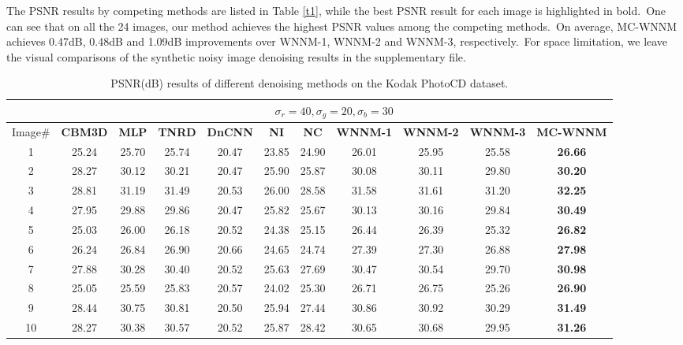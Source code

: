 The PSNR results by competing methods are listed in Table \ref{t1}, while the best PSNR result for each image is highlighted in bold.\ One can see that on all the 24 images, our method achieves the highest PSNR values among the competing methods.\ On average, MC-WNNM achieves 0.47dB, 0.48dB and 1.09dB improvements over WNNM-1, WNNM-2 and WNNM-3, respectively.\ For space limitation, we leave the visual comparisons of the synthetic noisy image denoising results in the supplementary file.

\begin{table}
\caption{PSNR(dB) results of different denoising methods on the Kodak PhotoCD dataset.}
\label{t1}
\label{taba}
\begin{center}
\renewcommand\arraystretch{1.0}
\scriptsize
\begin{tabular}{|c||c|c|c|c|c|c|c|c|c|c|}
\hline
&\multicolumn{10}{c|}{ $\sigma_{r} = 40, \sigma_{g} = 20, \sigma_{b} = 30$}
\\
\hline
\hline
Image\#
&
\textbf{CBM3D}
&
\textbf{MLP}
&
\textbf{TNRD}
&
\textbf{DnCNN}
&
\textbf{NI}
&
\textbf{NC}
&
\textbf{WNNM-1}
&
\textbf{WNNM-2}
&
\textbf{WNNM-3}
&
\textbf{MC-WNNM}
\\
\hline
1& 25.24 & 25.70 & 25.74 & 20.47 & 23.85 & 24.90 & 26.01 & 25.95 & 25.58 & \textbf{26.66}
\\
\hline
2& 28.27 & 30.12 & 30.21 & 20.47 & 25.90 & 25.87 & 30.08 & 30.11 & 29.80 & \textbf{30.20} 
\\
\hline
3& 28.81 & 31.19 & 31.49 & 20.53 & 26.00 & 28.58 & 31.58 & 31.61 & 31.20 & \textbf{32.25}  
\\
\hline 
4& 27.95 & 29.88 & 29.86 & 20.47 & 25.82 & 25.67 & 30.13 & 30.16 & 29.84 & \textbf{30.49} 
\\
\hline
5& 25.03 & 26.00 & 26.18 & 20.52 & 24.38 & 25.15 & 26.44 & 26.39 & 25.32 & \textbf{26.82}
\\
\hline
6& 26.24 & 26.84 & 26.90 & 20.66 & 24.65 & 24.74 & 27.39 & 27.30 & 26.88 & \textbf{27.98} 
\\
\hline
7& 27.88 & 30.28 & 30.40 & 20.52 & 25.63 & 27.69 & 30.47 & 30.54 & 29.70 & \textbf{30.98} 
\\
\hline
8& 25.05 & 25.59 & 25.83 & 20.57 & 24.02 & 25.30 & 26.71 & 26.75 & 25.26 & \textbf{26.90}
\\
\hline
9& 28.44 & 30.75 & 30.81 & 20.50 & 25.94 & 27.44 & 30.86 & 30.92 & 30.29 & \textbf{31.49}
\\
\hline
10& 28.27 & 30.38 & 30.57 & 20.52 & 25.87 & 28.42 & 30.65 & 30.68 & 29.95 & \textbf{31.26}

\end{tabular}
\end{center}
\end{table}
